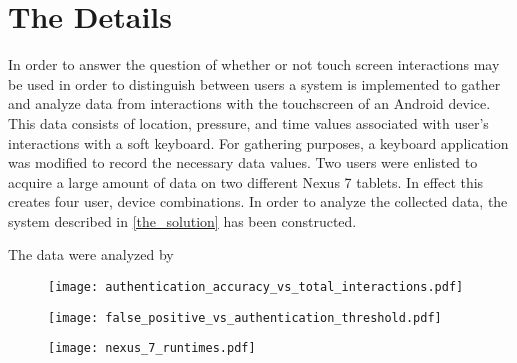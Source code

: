 \section{The Details}
\label{the_details}
In order to answer the question of
whether or not touch screen interactions may be used
in order to distinguish between users
a system is implemented to gather and analyze data
from interactions with the touchscreen of an Android device.
This data consists of location, pressure, and time
values associated with user's interactions with a soft keyboard.
%
For gathering purposes,
a keyboard application was modified to record
the necessary data values.
%
Two users were enlisted to acquire a large 
amount of data on two different Nexus 7 tablets.
In effect this creates four user, device combinations.
%
In order to analyze the collected data,
the system described in \ref{the_solution}
has been constructed.

The data were analyzed by 


\begin{figure}[htb]
\caption{}
\begin{center}
\texttt{[image: authentication\_accuracy\_vs\_total\_interactions.pdf]}
\label{figure_authentication_accuracy}
\end{center}
\end{figure}

\begin{figure}[hbt]
\caption{}
\begin{center}
\texttt{[image: false\_positive\_vs\_authentication\_threshold.pdf]}
\label{figure_false_positive}
\end{center}
\end{figure}

\begin{figure}[hbt]
\caption{}
\begin{center}
\texttt{[image: nexus\_7\_runtimes.pdf]}
\label{figure_nexus_7_runtimes}
\end{center}
\end{figure}

